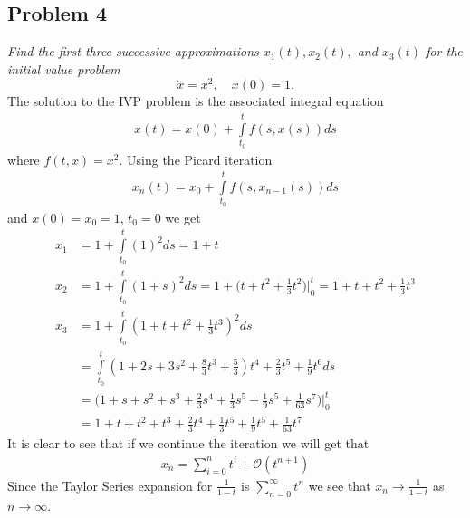 \documentclass[12pt]{article}
\theoremstyle{remark}
\begin{document}
 	\newpage
 	
 	\subsection*{Problem 4}
 	
 	\textit{Find the first three successive approximations $x_1(t), x_2(t),$ and $x_3(t)$ for the initial value problem}
 	$$ \dot{x} = x^2, \quad x(0) = 1. $$
 	The solution to the IVP problem is the associated integral equation
 	\begin{align*}
 	x(t) = x(0) + \int\limits_{t_0}^{t} f(s, x(s)) ds
 	\end{align*}
 	where $f(t,x) = x^2$. Using the Picard iteration 
 	\begin{align*}
 	x_n(t) = x_{0} + \int\limits_{t_0}^{t} f(s, x_{n-1}(s)) ds
 	\end{align*}
 	and $x(0) = x_0 = 1$, $t_0 = 0$ we get
 	\begin{align*}
 	x_1 & = 1 + \int\limits_{t_0}^t (1)^2 ds = 1 + t \\
 	x_2 & = 1 + \int\limits_{t_0}^t (1+s)^2 ds = 1 + \Big(t + t^2 + \frac{1}{3}t^2\Big)\Big|_{0}^t = 1 + t + t^2 + \frac{1}{3}t^3 \\
 	x_3 & = 1 + \int\limits_{t_0}^t (1 + t + t^2 + \frac{1}{3}t^3)^2 ds \\
 	& = \int\limits_{t_0}^t (1 + 2s + 3s^2 + \frac{8}{3}t^3 + \frac{5}3)t^4 + \frac{2}{3}t^5 + \frac{1}{9}t^6 ds \\
 	& = \Big(1 + s + s^2 + s^3 + \frac{2}{3}s^4 + \frac{1}{3}s^5 + \frac{1}{9}s^5 + \frac{1}{63}s^7\Big)\Big|_0^t \\
 	& = 1 + t + t^2 + t^3 + \frac{2}{3}t^4 + \frac{1}{3}t^5 + \frac{1}{9}t^5 + \frac{1}{63}t^7
 	\end{align*}
 	It is clear to see that if we continue the iteration we will get that 
 	\begin{align*}
 	x_n = \sum\limits_{i=0}^n t^i + \mathcal{O}(t^{n+1}) 
 	\end{align*}
 	Since the Taylor Series expansion for $\frac{1}{1-t}$ is $\sum_{n=0}^\infty t^n$ we see that $x_n \rightarrow \frac{1}{1-t}$ as $n \rightarrow \infty$.
 	
 
\end{document}
